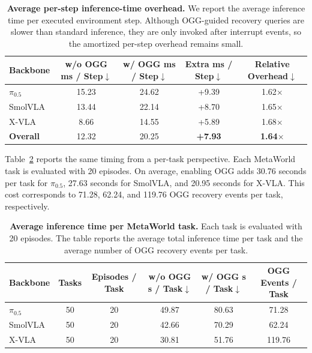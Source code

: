 \begin{table}[t]
  \centering
  \small
  \setlength{\tabcolsep}{8pt}
  \renewcommand{\arraystretch}{1.12}
  \caption{
  \textbf{Average per-step inference-time overhead.}
  We report the average inference time per executed environment step. 
  Although OGG-guided recovery queries are slower than standard inference, they are only invoked after interrupt events, so the amortized per-step overhead remains small.
  }
  \label{tab:per_step_timing}
  \begin{tabular}{lcccc}
    \toprule
    \rowcolor{headerbg}
    \textbf{Backbone}
    & \textbf{w/o OGG ms / Step}$\downarrow$
    & \textbf{w/ OGG ms / Step}$\downarrow$
    & \textbf{Extra ms / Step}$\downarrow$
    & \textbf{Relative Overhead}$\downarrow$ \\
    \midrule
    $\pi_{0.5}$ 
      & 15.23 
      & 24.62 
      & \cellcolor{softred}+9.39 
      & \cellcolor{softred}1.62$\times$ \\
    SmolVLA     
      & 13.44 
      & 22.14 
      & \cellcolor{softred}+8.70 
      & \cellcolor{softred}1.65$\times$ \\
    X-VLA       
      & 8.66  
      & 14.55 
      & \cellcolor{softred}+5.89 
      & \cellcolor{softred}1.68$\times$ \\
    \midrule
    \textbf{Overall} 
      & 12.32 
      & 20.25 
      & \cellcolor{softred}\textbf{+7.93} 
      & \cellcolor{softred}\textbf{1.64$\times$} \\
    \bottomrule
  \end{tabular}
\end{table}

Table~\ref{tab:per_task_timing} reports the same timing from a per-task perspective. Each MetaWorld task is evaluated with 20 episodes. On average, enabling OGG adds 30.76 seconds per task for $\pi_{0.5}$, 27.63 seconds for SmolVLA, and 20.95 seconds for X-VLA. This cost corresponds to 71.28, 62.24, and 119.76 OGG recovery events per task, respectively.

\begin{table}[t]
  \centering
  \small
  \setlength{\tabcolsep}{6pt}
  \renewcommand{\arraystretch}{1.12}
  \caption{
  \textbf{Average inference time per MetaWorld task.}
  Each task is evaluated with 20 episodes. 
  The table reports the average total inference time per task and the average number of OGG recovery events per task.
  }
  \label{tab:per_task_timing}
  \begin{tabular}{lccccc}
    \toprule
    \rowcolor{headerbg}
    \textbf{Backbone}
    & \textbf{Tasks}
    & \textbf{Episodes / Task}
    & \textbf{w/o OGG s / Task}$\downarrow$
    & \textbf{w/ OGG s / Task}$\downarrow$
    & \textbf{OGG Events / Task} \\
    \midrule
    $\pi_{0.5}$ & 50 & 20 & 49.87 & 80.63 & 71.28 \\
    SmolVLA     & 50 & 20 & 42.66 & 70.29 & 62.24 \\
    X-VLA       & 50 & 20 & 30.81 & 51.76 & 119.76 \\
    \bottomrule
  \end{tabular}
\end{table}

